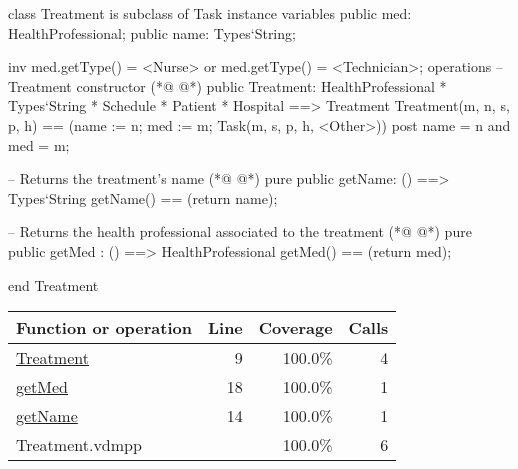 \begin{vdmpp}[breaklines=true]
class Treatment is subclass of Task
instance variables
  public med: HealthProfessional;
  public name: Types`String;
  
  inv med.getType() = <Nurse> or med.getType() = <Technician>;
operations
 -- Treatment constructor
(*@
\label{Treatment:9}
@*)
 public Treatment: HealthProfessional * Types`String * Schedule * Patient * Hospital ==> Treatment
  Treatment(m, n, s, p, h) == (name := n; med := m; Task(m, s, p, h, <Other>))
 post name = n and med = m;
 
 -- Returns the treatment's name
(*@
\label{getName:14}
@*)
 pure public getName: () ==> Types`String
  getName() == (return name);
 
 -- Returns the health professional associated to the treatment
(*@
\label{getMed:18}
@*)
 pure public getMed : () ==> HealthProfessional
  getMed() == (return med);

end Treatment
\end{vdmpp}
\bigskip
\begin{longtable}{|l|r|r|r|}
\hline
Function or operation & Line & Coverage & Calls \\
\hline
\hline
\hyperref[Treatment:9]{Treatment} & 9&100.0\% & 4 \\
\hline
\hyperref[getMed:18]{getMed} & 18&100.0\% & 1 \\
\hline
\hyperref[getName:14]{getName} & 14&100.0\% & 1 \\
\hline
\hline
Treatment.vdmpp & & 100.0\% & 6 \\
\hline
\end{longtable}

